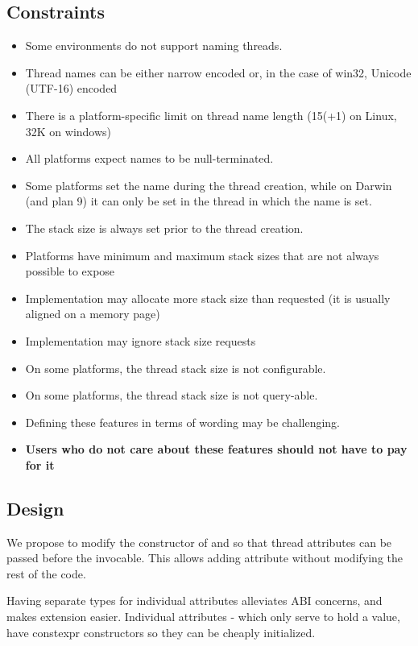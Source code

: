 \documentclass{wg21}
\begin{document}
\subsection{Constraints}

\begin{itemize}
\item Some environments do not support naming threads.
\item Thread names can be either narrow encoded or, in the case of win32, Unicode (UTF-16) encoded
\item There is a platform-specific limit on thread name length (15(+1) on Linux, 32K on windows)
\item All platforms expect names to be null-terminated.
\item Some platforms set the name during the thread creation, while on Darwin (and plan 9) it can only be set in the thread in which the name is set.
\item The stack size is always set prior to the thread creation.
\item Platforms have minimum and maximum stack sizes that are not always possible to expose
\item Implementation may allocate more stack size than requested (it is usually aligned on a memory page)
\item Implementation may ignore stack size requests
\item On some platforms, the thread stack size is not configurable.
\item On some platforms, the thread stack size is not query-able.
\item Defining these features in terms of wording may be challenging.
\item \textbf{Users who do not care about these features should not have to pay for it}
\end{itemize}

\subsection{Design}

We propose to modify the constructor of  and 
so that thread attributes can be passed before the invocable.
This allows adding attribute without modifying the rest of the code.

Having separate types for individual attributes alleviates ABI concerns, and makes extension easier.
Individual attributes - which only serve to hold a value, have constexpr constructors so they can be cheaply initialized.
\end{document}
